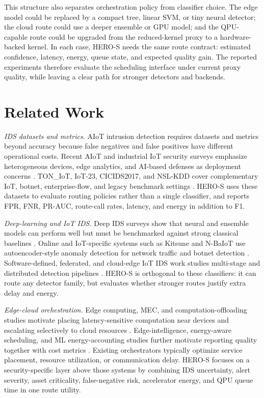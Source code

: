 \documentclass[conference]{IEEEtran}
\begin{document}
This structure also separates orchestration policy from classifier choice. The edge model could be replaced by a compact tree, linear SVM, or tiny neural detector; the cloud route could use a deeper ensemble or GPU model; and the QPU-capable route could be upgraded from the reduced-kernel proxy to a hardware-backed kernel. In each case, HERO-S needs the same route contract: estimated confidence, latency, energy, queue state, and expected quality gain. The reported experiments therefore evaluate the scheduling interface under current proxy quality, while leaving a clear path for stronger detectors and backends.


\section{Related Work}
\textit{IDS datasets and metrics.} AIoT intrusion detection requires datasets and metrics beyond accuracy because false negatives and false positives have different operational costs. Recent AIoT and industrial IoT security surveys emphasize heterogeneous devices, edge analytics, and AI-based defenses as deployment concerns \cite{siam2025aiot,alotaibi2023iiotsecurity}. TON\_IoT, IoT-23, CICIDS2017, and NSL-KDD cover complementary IoT, botnet, enterprise-flow, and legacy benchmark settings \cite{alsaedi2020toniot,garcia2020iot23,sharafaldin2018toward,tavallaee2009kdd}. HERO-S uses these datasets to evaluate routing policies rather than a single classifier, and reports FPR, FNR, PR-AUC, route-call rates, latency, and energy in addition to F1.

\textit{Deep-learning and IoT IDS.} Deep IDS surveys show that neural and ensemble models can perform well but must be benchmarked against strong classical baselines \cite{ferrag2020deep}. Online and IoT-specific systems such as Kitsune and N-BaIoT use autoencoder-style anomaly detection for network traffic and botnet detection \cite{mirsky2018kitsune,meidan2018nbaiot}. Software-defined, federated, and cloud-edge IoT IDS work studies multi-stage and distributed detection pipelines \cite{li2019sdiotids,nguyen2019diot,mothukuri2021survey,yang2023cloudedgeids}. HERO-S is orthogonal to these classifiers: it can route any detector family, but evaluates whether stronger routes justify extra delay and energy.

\textit{Edge-cloud orchestration.} Edge computing, MEC, and computation-offloading studies motivate placing latency-sensitive computation near devices and escalating selectively to cloud resources \cite{shi2016edge,mach2017mec,satyanarayanan2017edge,mao2017mec}. Edge-intelligence, energy-aware scheduling, and ML energy-accounting studies further motivate reporting quality together with cost metrics \cite{zhou2019edgeintelligence,chen2023energy,strubell2019energy}. Existing orchestrators typically optimize service placement, resource utilization, or communication delay. HERO-S focuses on a security-specific layer above those systems by combining IDS uncertainty, alert severity, asset criticality, false-negative risk, accelerator energy, and QPU queue time in one route utility.
\end{document}
